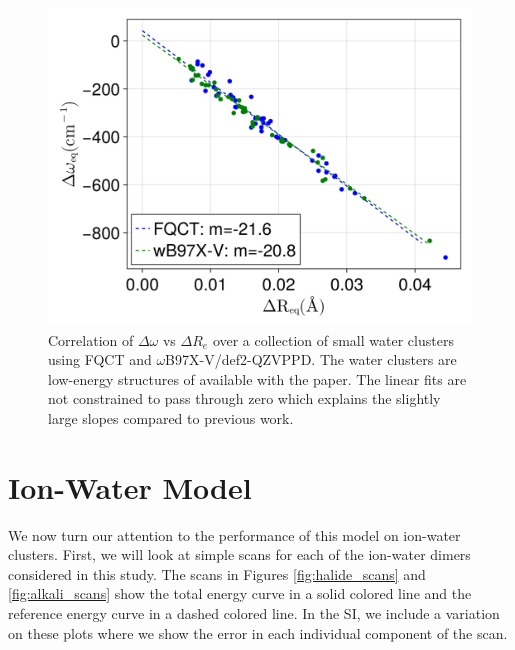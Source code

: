 \documentclass[journal=jacsat,manuscript=article]{achemso}
\begin{document}
\begin{figure}[h]
  \includegraphics*[width=\textwidth]{figures/badger_correlation_final.png}
  \caption{Correlation of $\Delta\omega$ vs $\Delta R_e$ over a collection
  of small water clusters using FQCT and $\omega$B97X-V/def2-QZVPPD.
  The water clusters are low-energy structures of  available
  with the paper. The linear fits are not constrained to pass through zero
  which explains the slightly large slopes compared to previous work.\cite{boyer2019beyond}
}
  \label{fig:badger}
\end{figure}

\section*{Ion-Water Model}

We now turn our attention to the performance of this model on ion-water clusters.
First, we will look at simple scans for each of the ion-water dimers considered
in this study. The scans in Figures \ref{fig:halide_scans} and \ref{fig:alkali_scans}
show the total energy curve in a solid colored line and the reference energy curve in
a dashed colored line. In the SI, we include a variation on these plots where
we show the error in each individual component of the scan.
\end{document}
